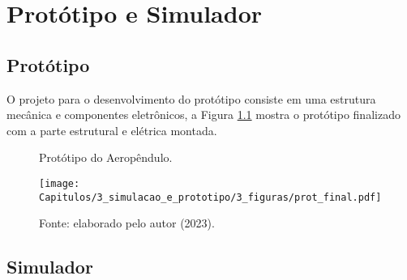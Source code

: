 \chapter{Protótipo e Simulador}

\section{Protótipo}

O projeto para o desenvolvimento do protótipo consiste em uma estrutura mecânica e componentes eletrônicos, a Figura \ref{fig3:image_01} mostra o protótipo finalizado com a parte estrutural e elétrica montada.

\begin{figure}[!h]
	\centering
	\caption{Protótipo do Aeropêndulo.}
	\texttt{[image: Capitulos/3\_simulacao\_e\_prototipo/3\_figuras/prot\_final.pdf]}
	\caption*{Fonte: elaborado pelo autor (2023).}
	\label{fig3:image_01}
\end{figure}






\section{ Simulador}

